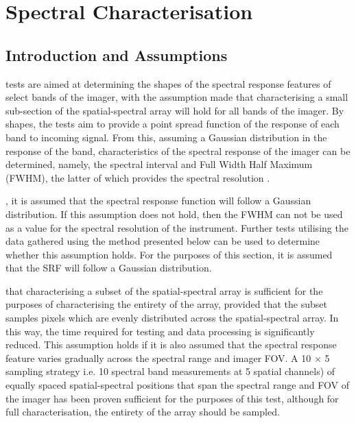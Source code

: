 \documentclass[nohyper,nobib]{tufte-book}
\begin{document}
\chapter{Spectral Characterisation}
\label{ch:SpectralCharacterisation}

\section{Introduction and Assumptions}
 tests are aimed at determining the shapes of the spectral response features of select bands of the imager, with the assumption made that characterising a small sub-section of the spatial-spectral array will hold for all bands of the imager. 
By shapes, the tests aim to provide a point spread function of the response of each band to incoming signal. From this, assuming a Gaussian distribution in the response of the band, characteristics of the spectral response of the imager can be determined, namely, the spectral interval and  Full Width Half Maximum (FWHM), the latter of which provides the spectral resolution . 

, it is assumed that the spectral response function will follow a Gaussian distribution. If this assumption does not hold, then the FWHM can not be used as a value for the spectral resolution of the instrument. Further tests utilising the data gathered using the method presented below can be used to determine whether this assumption holds. For the purposes of this section, it is assumed that the SRF will follow a Gaussian distribution. 

 that characterising a subset of the spatial-spectral array is sufficient for the purposes of characterising the entirety of the array, provided that the subset samples pixels which are evenly distributed across the spatial-spectral array. In this way, the time required for testing and data processing is significantly reduced. This assumption holds if it is also assumed that the spectral response feature varies gradually across the spectral range and imager FOV.  A 10 $\times$ 5 sampling strategy i.e. 10 spectral band measurements at 5 spatial channels) of equally spaced spatial-spectral positions that span the spectral range and  FOV of the imager has been proven sufficient for the purposes of this test, although for full characterisation, the entirety of the array should be sampled. 
\end{document}
